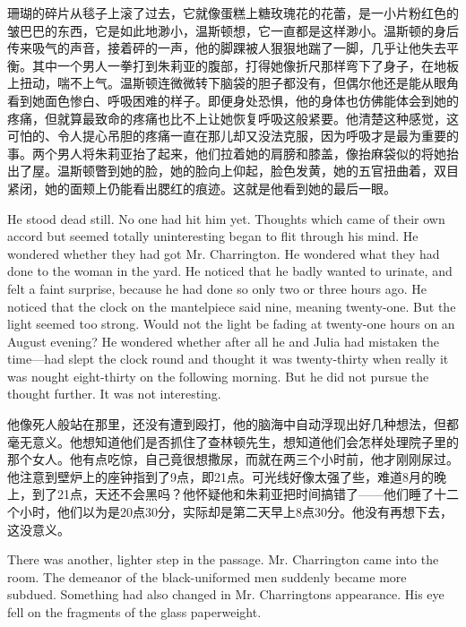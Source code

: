 \begin{paracol}{2}
\switchcolumn

珊瑚的碎片从毯子上滚了过去，它就像蛋糕上糖玫瑰花的花蕾，是一小片粉红色的皱巴巴的东西，它是如此地渺小，温斯顿想，它一直都是这样渺小。温斯顿的身后传来吸气的声音，接着砰的一声，他的脚踝被人狠狠地踹了一脚，几乎让他失去平衡。其中一个男人一拳打到朱莉亚的腹部，打得她像折尺那样弯下了身子，在地板上扭动，喘不上气。温斯顿连微微转下脑袋的胆子都没有，但偶尔他还是能从眼角看到她面色惨白、呼吸困难的样子。即便身处恐惧，他的身体也仿佛能体会到她的疼痛，但就算最致命的疼痛也比不上让她恢复呼吸这般紧要。他清楚这种感觉，这可怕的、令人提心吊胆的疼痛一直在那儿却又没法克服，因为呼吸才是最为重要的事。两个男人将朱莉亚抬了起来，他们拉着她的肩膀和膝盖，像抬麻袋似的将她抬出了屋。温斯顿瞥到她的脸，她的脸向上仰起，脸色发黄，她的五官扭曲着，双目紧闭，她的面颊上仍能看出腮红的痕迹。这就是他看到她的最后一眼。

\switchcolumn*

He stood dead still. No one had hit him yet. Thoughts which came of
their own accord but seemed totally uninteresting began to flit through
his mind. He wondered whether they had got Mr. Charrington. He wondered
what they had done to the woman in the yard. He noticed that he badly
wanted to urinate, and felt a faint surprise, because he had done so
only two or three hours ago. He noticed that the clock on the
mantelpiece said nine, meaning twenty-one. But the light seemed too
strong. Would not the light be fading at twenty-one hours on an August
evening? He wondered whether after all he and Julia had mistaken the
time---had slept the clock round and thought it was twenty-thirty when
really it was nought eight-thirty on the following morning. But he did
not pursue the thought further. It was not interesting.

\switchcolumn

他像死人般站在那里，还没有遭到殴打，他的脑海中自动浮现出好几种想法，但都毫无意义。他想知道他们是否抓住了查林顿先生，想知道他们会怎样处理院子里的那个女人。他有点吃惊，自己竟很想撒尿，而就在两三个小时前，他才刚刚尿过。他注意到壁炉上的座钟指到了9点，即21点。可光线好像太强了些，难道8月的晚上，到了21点，天还不会黑吗？他怀疑他和朱莉亚把时间搞错了——他们睡了十二个小时，他们以为是20点30分，实际却是第二天早上8点30分。他没有再想下去，这没意义。

\switchcolumn*

There was another, lighter step in the passage. Mr. Charrington came
into the room. The demeanor of the black-uniformed men suddenly became
more subdued. Something had also changed in Mr.
Charrington\textquotesingle s appearance. His eye fell on the fragments
of the glass paperweight.


\end{paracol}
